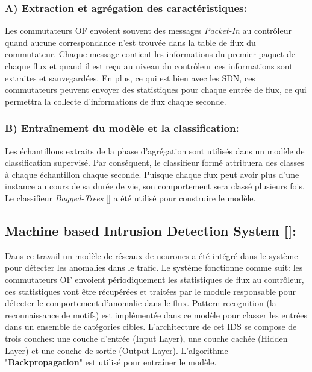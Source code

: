 \subsubsection{A) Extraction et agrégation des caractéristiques:}
Les commutateurs OF envoient souvent des messages \textit{Packet-In} au contrôleur quand aucune correspondance n’est trouvée dans la table de flux du commutateur. Chaque message contient les informations du premier paquet de chaque flux et quand il est reçu au niveau du contrôleur ces informations sont extraites et sauvegardées. En plus, ce qui est bien avec les SDN, ces commutateurs peuvent envoyer des statistiques pour chaque entrée de flux, ce qui permettra la collecte d'informations de flux chaque seconde. 

\subsubsection{B) Entraînement du modèle et la classification:}
Les échantillons extraits de la phase d’agrégation sont utilisés dans un modèle de classification supervisé. Par conséquent, le classifieur formé attribuera des classes à chaque échantillon chaque seconde. Puisque chaque flux peut avoir plus d’une instance au cours de sa durée de vie, son comportement sera classé plusieurs fois. Le classifieur \textit{Bagged-Trees} [\cite{12}] a été utilisé pour construire le modèle.
\newpage
\subsection{Machine based Intrusion Detection System [\cite{13}]:}
Dans ce travail un modèle de réseaux de neurones a été intégré dans le système pour détecter les anomalies dans le trafic. Le système fonctionne comme suit: les commutateurs OF envoient périodiquement les statistiques de flux au contrôleur, ces statistiques vont être récupérées et traitées par le module responsable pour détecter le comportement d’anomalie dans le flux. Pattern recognition (la reconnaissance de motifs) est implémentée dans ce modèle pour classer les entrées dans un ensemble de catégories cibles. L’architecture de cet IDS se compose de trois couches: une couche d’entrée (Input Layer), une couche cachée (Hidden Layer) et une couche de sortie (Output Layer). L’algorithme "\textbf{Backpropagation}" est utilisé pour entraîner le modèle.\\


